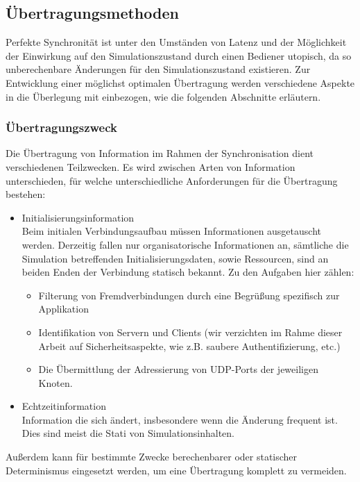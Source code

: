 \documentclass[11pt,twoside,a4paper]{article}
\begin{document}
\subsection{Übertragungsmethoden}
\label{sec:transmission_formats}
Perfekte Synchronität ist unter den Umständen von Latenz und der Möglichkeit der Einwirkung auf den Simulationszustand durch einen Bediener utopisch, da so unberechenbare Änderungen für den Simulationszustand existieren.
Zur Entwicklung einer möglichst optimalen Übertragung werden verschiedene Aspekte in die Überlegung mit einbezogen, wie die folgenden Abschnitte erläutern.

\subsubsection{Übertragungszweck}
Die Übertragung von Information im Rahmen der Synchronisation dient verschiedenen Teilzwecken.
Es wird zwischen Arten von Information unterschieden, für welche unterschiedliche Anforderungen für die Übertragung bestehen:
\begin{itemize}
\item Initialisierungsinformation\\
Beim initialen Verbindungsaufbau müssen Informationen ausgetauscht werden.
Derzeitig fallen nur organisatorische Informationen an, sämtliche die Simulation betreffenden Initialisierungsdaten, sowie Ressourcen, sind an beiden Enden der Verbindung statisch bekannt.
Zu den Aufgaben hier zählen:
\begin{itemize}
\item Filterung von Fremdverbindungen durch eine Begrüßung spezifisch zur Applikation
\item Identifikation von Servern und Clients (wir verzichten im Rahme dieser Arbeit auf Sicherheitsaspekte, wie z.B. saubere Authentifizierung, etc.)
\item Die Übermittlung der Adressierung von UDP-Ports der jeweiligen Knoten.
\end{itemize}
\item Echtzeitinformation\\
Information die sich ändert, insbesondere wenn die Änderung frequent ist.
Dies sind meist die Stati von Simulationsinhalten.
\end{itemize}

Außerdem kann für bestimmte Zwecke berechenbarer oder statischer Determinismus eingesetzt werden, um eine Übertragung komplett zu vermeiden.
\end{document}
